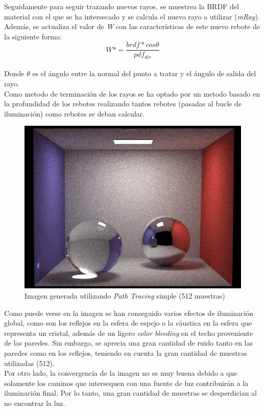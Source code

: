 \documentclass[10pt,oneside,a4paper]{article}
\begin{document}
Seguidamente para seguir trazando nuevos rayos, se muestrea la BRDF del material con el que se ha intersecado y se calcula el nuevo rayo a utilizar (\textit{mRay}). Además, se actualiza el valor de \textit{W} con las características de este nuevo rebote de la siguiente forma:
$$W *= \frac{brdf * cos\theta}{pdf_{dir}}$$\\

Donde $\theta$ es el ángulo entre la normal del punto a tratar y el ángulo de salida del rayo. \\

Como metodo de terminación de los rayos se ha optado por un metodo basado en la profundidad de los rebotes realizando tantos rebotes (pasadas al bucle de iluminación) como rebotes se deban calcular.

\begin{figure}[h]
\centering
\includegraphics[width=.6\linewidth]{images/cbox_path_512.png}
\caption{Imagen generada utilizando \textit{Path Tracing} simple (512 muestras)}
\label{fig:disp}
\end{figure}

Como puede verse en la imagen se han conseguido varios efectos de iluminación global, como son los reflejos en la esfera de espejo o la cáustica en la esfera que representa un cristal, además de un ligero \textit{color bleeding} en el techo proveniente de las paredes. Sin embargo, se aprecia una gran cantidad de ruido tanto en las paredes como en los reflejos, teniendo en cuenta la gran cantidad de muestras utilizadas (512).\\

Por otro lado, la convergencia de la imagen no es muy buena debido a que solamente los caminos que intersequen con una fuente de luz contribuirán a la iluminación final. Por lo tanto, una gran cantidad de muestras se desperdician al no encontrar la luz.
\end{document}
